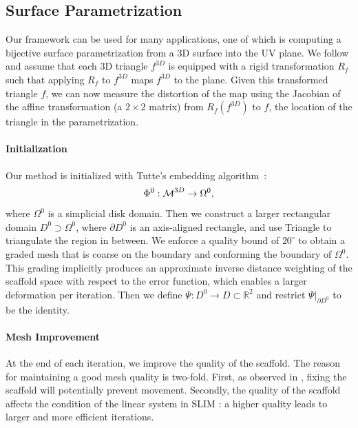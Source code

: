 \subsection{Surface Parametrization}
Our framework can be used for many applications, one of which is computing a bijective surface parametrization from a 3D surface into the UV  plane. We follow \cite{Liu:2008} and assume that each 3D triangle $f^{3D}$ is equipped with a rigid transformation $R_f$ such that applying $R_f$ to $f^{3D}$ maps $f^{3D}$ to the plane. Given this transformed triangle $f$, we can now measure the distortion of the map using the Jacobian of the affine transformation (a $2\times2$ matrix) from $R_f(f^{3D})$ to $f$, the location of the triangle in the parametrization.

\paragraph{Initialization} Our method is initialized with Tutte's embedding algorithm~\cite{Tutte:1963}:
\[\Phi^0 : \operatorname{\mathcal{M}}^{3D} \rightarrow \Omega^0,\]
where $\Omega^0$ is a simplicial disk domain. Then we construct a larger rectangular domain $D^0 \supset \Omega^0$, where $\partial D^0$ is an axis-aligned rectangle, and use Triangle \cite{Shewchuk:1996} to triangulate the region in between.  We enforce a quality bound of $20^\circ$ to obtain a graded mesh that is coarse on the boundary and conforming the boundary of $\Omega^0$. This grading implicitly produces an approximate inverse distance  weighting of the scaffold space with respect to the error function, which enables a larger deformation per iteration. Then we define $\Psi: D^0 \rightarrow D \subset \mathbb{R}^{2}$ and restrict $\Psi |_{\partial D^0}$ to be the identity.

\paragraph{Mesh Improvement}
At the end of each iteration, we improve the quality of the scaffold. The reason for maintaining a good mesh quality is two-fold. 
First, as observed in \cite{Zhang:2005, Muller:2015}, fixing the scaffold will potentially prevent movement. Secondly, the quality of the scaffold affects the condition of the linear system in SLIM \cite{Rabinovich:2017}: a higher  quality leads to larger and more efficient iterations.

